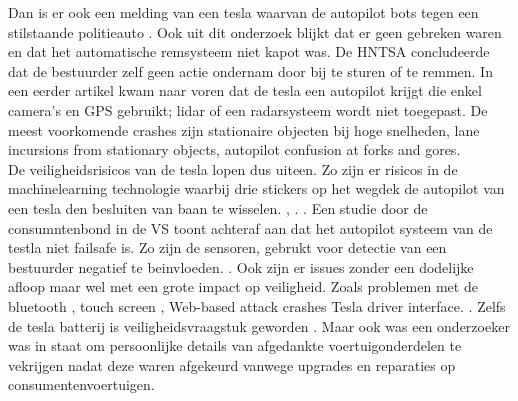 \documentclass{article}
\begin{document}
	\cite{tiungteslasoftwarecrash}
	Dan  is er ook een melding van een tesla waarvan de autopilot bots tegen een stilstaande politieauto
	\cite{kierstein18032021teslaAutopilotCrashStationary}. Ook uit dit onderzoek blijkt dat er geen gebreken waren en dat het automatische remsysteem niet  kapot was. De HNTSA concludeerde dat de bestuurder zelf geen actie ondernam door  bij te sturen of te remmen. In een eerder artikel kwam naar voren dat de tesla een autopilot krijgt die enkel camera's en GPS gebruikt; lidar of een radarsysteem wordt niet toegepast.
	\cite{janssen20062017teslacrashdetailflorida}
	De meest voorkomende crashes zijn stationaire objecten bij hoge snelheden, lane incursions from stationary objects, autopilot confusion at forks and gores.
	\cite{teslaCrashesCauses}
	\cite{teslacrashOvervieuw}
	\cite{tesladeaths} \\
	De veiligheidsrisicos van de tesla lopen dus uiteen. Zo zijn er risicos in de machinelearning technologie waarbij drie stickers op het wegdek de autopilot van een tesla den besluiten van baan te wisselen.
	\cite{evan01042019teslaautopilotIntersection},
	\cite{lambert31062020q2safetyreport}.
	\cite{templeton06092019HTSBReportTesla}. Een studie door de consumntenbond in de VS toont achteraf aan dat het autopilot systeem van de testla niet failsafe is. Zo zijn de sensoren, gebrukt voor detectie van een bestuurder negatief te beinvloeden.
	\cite{dowling23042021autopilottricking}.
	Ook zijn er issues zonder een dodelijke afloop maar wel met een grote impact op veiligheid. Zoals problemen met de bluetooth 
	\cite{wiredBloutoothHackTesla}, touch screen
	\cite{preston14012021NHTSATeslaRecall}\cite{preston14012021NHTSATeslaRecall},
	Web-based attack crashes Tesla driver interface.
	\cite{leyden23032020TeslaInterfaceHack}.
	Zelfs de tesla batterij is veiligheidsvraagstuk geworden
	\cite{mitchell01072020teslabatterycooling}\cite{bbc24022021hyundaiBatteryFireFix}.
	Maar ook was een onderzoeker  was in staat om persoonlijke details van afgedankte voertuigonderdelen  te vekrijgen nadat deze waren afgekeurd vanwege upgrades en reparaties op consumentenvoertuigen.
\end{document}
